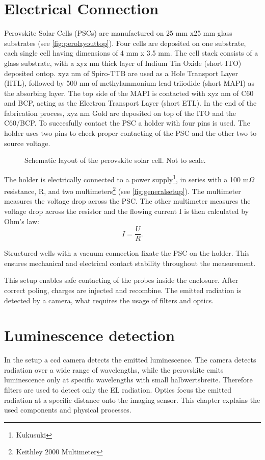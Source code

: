 \section{Electrical Connection}\label{sec:electricalconnection}
Perovskite Solar Cells (PSCs) are manufactured on 25 mm x25 mm glass substrates (see \autoref{fig:perolayouttop}). Four cells are deposited on one substrate, each single cell having dimensions of 4 mm x 3.5 mm. The cell stack consists of a glass substrate, with a xyz nm thick layer of Indium Tin Oxide (short ITO) deposited ontop. xyz nm of Spiro-TTB are used as a Hole Transport Layer (HTL), followed by 500 nm of methylammonium lead triiodide (short MAPI) as the absorbing layer. The top side of the MAPI is contacted with xyz nm of C60 and BCP, acting as the Electron Transport Layer (short ETL). In the end of the fabrication process, xyz nm Gold are deposited on top of the ITO and the C60/BCP. To succesfully contact the PSC a holder with four pins is used. The holder uses two pins to check proper contacting of the PSC and the other two to source voltage.
\begin{figure}
	\centering
	
	\caption{Schematic layout of the perovskite solar cell. Not to scale.}
	\label{fig:perolayouttop}
\end{figure}

The holder is electrically connected to a power supply\footnote{Kukusuki}, in series with a 100 m$\Omega$ resistance, R, and two multimeters\footnote{Keithley 2000 Multimeter} (see \autoref{fig:generalsetup}). The multimeter measures the voltage drop across the PSC. The other multimeter measures the voltage drop across the resistor and the flowing current I is then calculated by Ohm's law:
\begin{equation}
	I = \frac{U}{R}.
\end{equation}

Structured wells with a vacuum connection fixate the PSC on the holder. This ensures mechanical and electrical contact stability throughout the measurement.

This setup enables safe contacting of the probes inside the enclosure. After correct poling, charges are injected and recombine. The emitted radiation is detected by a camera, what requires the usage of filters and optics.

\section{Luminescence detection}\label{sec:luminescencedetection}
In the setup a ccd camera detects the emitted luminescence. The camera detects radiation over a wide range of wavelengths, while the perovskite emits luminescence only at specific wavelengths with small halbwertsbreite. Therefore filters are used to detect only the EL radiation. Optics focus the emitted radiation at a specific distance onto the imaging sensor. This chapter explains the used components and physical processes.
